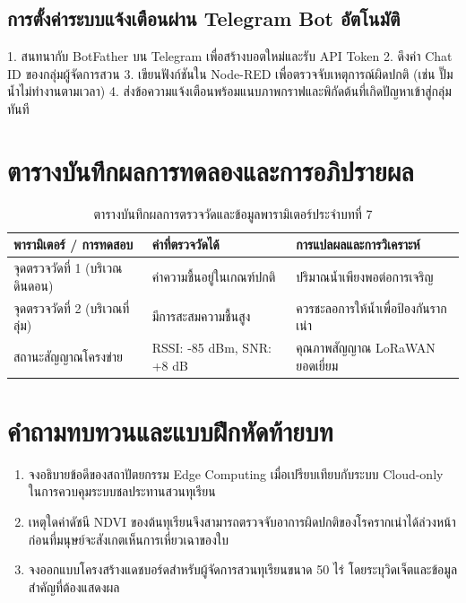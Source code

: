 \subsection{การตั้งค่าระบบแจ้งเตือนผ่าน Telegram Bot อัตโนมัติ}
\begin{sensorbox}
1. สนทนากับ BotFather บน Telegram เพื่อสร้างบอตใหม่และรับ API Token
2. ดึงค่า Chat ID ของกลุ่มผู้จัดการสวน
3. เขียนฟังก์ชันใน Node-RED เพื่อตรวจจับเหตุการณ์ผิดปกติ (เช่น ปั๊มน้ำไม่ทำงานตามเวลา)
4. ส่งข้อความแจ้งเตือนพร้อมแนบภาพกราฟและพิกัดต้นที่เกิดปัญหาเข้าสู่กลุ่มทันที
\end{sensorbox}

\section{ตารางบันทึกผลการทดลองและการอภิปรายผล}
\begin{table}[H]
\centering\small
\caption{ตารางบันทึกผลการตรวจวัดและข้อมูลพารามิเตอร์ประจำบทที่ 7}
\label{tab:ch07_datasheet}
\begin{tabularx}{\textwidth}{p{} p{} X}
\toprule
\textbf{พารามิเตอร์ / การทดสอบ} & \textbf{ค่าที่ตรวจวัดได้} & \textbf{การแปลผลและการวิเคราะห์} \\
\midrule
จุดตรวจวัดที่ 1 (บริเวณดินดอน) & ค่าความชื้นอยู่ในเกณฑ์ปกติ & ปริมาณน้ำเพียงพอต่อการเจริญ \\
จุดตรวจวัดที่ 2 (บริเวณที่ลุ่ม) & มีการสะสมความชื้นสูง & ควรชะลอการให้น้ำเพื่อป้องกันรากเน่า \\
สถานะสัญญาณโครงข่าย & RSSI: -85 dBm, SNR: +8 dB & คุณภาพสัญญาณ LoRaWAN ยอดเยี่ยม \\
\bottomrule
\end{tabularx}
\end{table}

\section{คำถามทบทวนและแบบฝึกหัดท้ายบท}
\begin{enumerate}
    \item จงอธิบายข้อดีของสถาปัตยกรรม Edge Computing เมื่อเปรียบเทียบกับระบบ Cloud-only ในการควบคุมระบบชลประทานสวนทุเรียน
    \item เหตุใดค่าดัชนี NDVI ของต้นทุเรียนจึงสามารถตรวจจับอาการผิดปกติของโรครากเน่าได้ล่วงหน้าก่อนที่มนุษย์จะสังเกตเห็นการเหี่ยวเฉาของใบ
    \item จงออกแบบโครงสร้างแดชบอร์ดสำหรับผู้จัดการสวนทุเรียนขนาด 50 ไร่ โดยระบุวิดเจ็ตและข้อมูลสำคัญที่ต้องแสดงผล
\end{enumerate}
